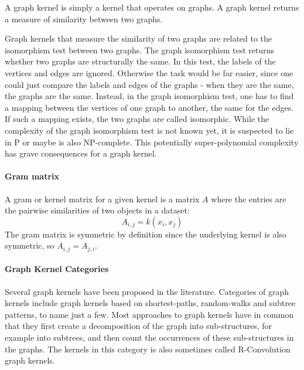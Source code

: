 A graph kernel is simply a kernel that operates on graphs. A graph kernel returns a measure of similarity between two graphs.

Graph kernels that measure the similarity of two graphs are related to the isomorphism test between two graphs.
The graph isomorphism test returns whether two graphs are structurally the same.
In this test, the labels of the vertices and edges are ignored. Otherwise the task would be far easier, since one could just compare the labels and edges of the graphs - when they are the same, the graphs are the same.
Instead, in the graph isomorphism test, one has to find a mapping between the vertices of one graph to another, the same for the edges.
If such a mapping exists, the two graphs are called isomorphic.
While the complexity of the graph isomorphism test is not known yet, it is suspected to lie in P or maybe is also NP-complete. This potentially super-polynomial complexity has grave consequences for a graph kernel.


\paragraph{Gram matrix}
A gram or kernel matrix for a given kernel is a matrix $A$ where the entries are the pairwise similarities of two objects in a dataset:
\begin{equation*}
    A_{i,j} = k(x_i, x_j)
\end{equation*}
The gram matrix is symmetric by definition since the underlying kernel is also symmetric, so $A_{i,j} = A_{j, i}$.

\paragraph{Graph Kernel Categories}
Several graph kernels have been proposed in the literature.
Categories of graph kernels include graph kernels based on shortest-paths, random-walks and subtree patterns, to name just a few.
Most approaches to graph kernels have in common that they first create a decomposition of the graph into sub-structures, for example into subtrees, and then count the occurrences of these sub-structures in the graphs.
The kernels in this category is also sometimes called R-Convolution graph kernels.

